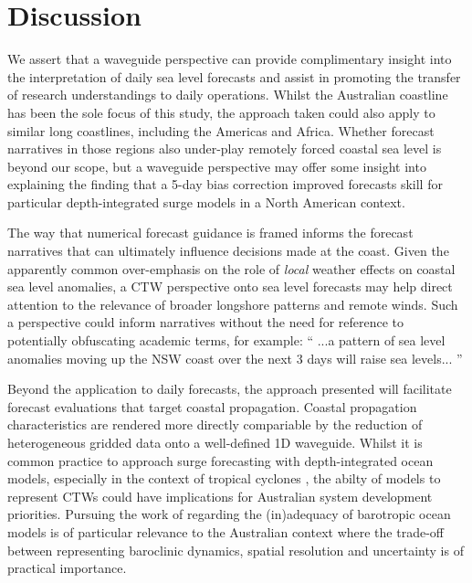 \section{Discussion}
We assert that a waveguide perspective can provide complimentary insight into the interpretation of daily sea level forecasts and assist in promoting the transfer of research understandings to daily operations.  
Whilst the Australian coastline has been the sole focus of this study, the approach taken could also apply to similar long coastlines, including the Americas and Africa. Whether forecast narratives in those regions also under-play remotely forced coastal sea level is beyond our scope, but a waveguide perspective may offer some insight into explaining the \citet{DiLiberto:2011} finding that a 5-day bias correction improved forecasts skill for particular depth-integrated surge models in a North American context.


The way that numerical forecast guidance is framed informs the forecast narratives that can ultimately influence decisions made at the coast.
Given the apparently common over-emphasis on the role of \emph{local} weather effects on coastal sea level anomalies, a CTW perspective onto sea level forecasts may help direct attention to the relevance of broader longshore patterns and remote winds.
Such a perspective could inform narratives without the need for reference to potentially obfuscating academic terms, for example:
``
...a pattern of sea level anomalies moving up the NSW coast over the next 3 days will raise sea levels... 
''

Beyond the application to daily forecasts, the approach presented will facilitate forecast evaluations that target coastal propagation.
Coastal propagation characteristics are rendered more directly compariable by the reduction of heterogeneous gridded data onto a well-defined 1D waveguide. 
Whilst it is common practice to approach surge forecasting with depth-integrated ocean models, especially in the context of tropical cyclones \citep{Veeramony:2017}, the abilty of models to represent CTWs could have implications for Australian system development priorities. 
Pursuing the work of \citet{Hetzel:2018hh} regarding the (in)adequacy of barotropic ocean models is of particular relevance to the Australian context where the trade-off between representing baroclinic dynamics, spatial resolution and uncertainty is of practical importance.  
     

